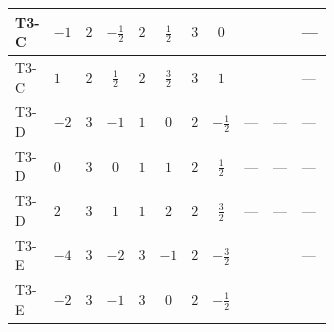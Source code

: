 \documentclass[8pt]{article}
\begin{document}
\begin{landscape}
\begin{longtable}{@{}llcccccc >{\raggedright\arraybackslash}p{0.21\linewidth} >{\raggedright\arraybackslash}p{0.21\linewidth} >{\raggedright\arraybackslash}p{0.21\linewidth}@{}}
\midrule
T3-C & $-1$ & $2$ & $-\frac{1}{2}$ & $2$ & $\frac{1}{2}$ & $3$ & $0$ & \scriptsize\adjustbox{max width=\linewidth}{$\begin{gathered} +8 {\lambda_{HS_2}^{(1)}} {\lambda_{HS_2}^{(A)}}\end{gathered}$} & \scriptsize\adjustbox{max width=\linewidth}{$\begin{gathered} +2 {\lambda_{HS_2}^{(A)}} {\lambda_{S_2}^{(1)}}\end{gathered}$} & --- \\
\midrule
T3-C & $1$ & $2$ & $\frac{1}{2}$ & $2$ & $\frac{3}{2}$ & $3$ & $1$ & \scriptsize\adjustbox{max width=\linewidth}{$\begin{gathered} +8 {\lambda_{HS_2}^{(1)}} {\lambda_{HS_2}^{(A)}}\end{gathered}$} & \scriptsize\adjustbox{max width=\linewidth}{$\begin{gathered} +2 {\lambda_{HS_2}^{(A)}} {\lambda_{S_2}^{(1)}}\end{gathered}$} & --- \\
\midrule
T3-D & $-2$ & $3$ & $-1$ & $1$ & $0$ & $2$ & $-\frac{1}{2}$ & --- & --- & --- \\
\midrule
T3-D & $0$ & $3$ & $0$ & $1$ & $1$ & $2$ & $\frac{1}{2}$ & --- & --- & --- \\
\midrule
T3-D & $2$ & $3$ & $1$ & $1$ & $2$ & $2$ & $\frac{3}{2}$ & --- & --- & --- \\
\midrule
T3-E & $-4$ & $3$ & $-2$ & $3$ & $-1$ & $2$ & $-\frac{3}{2}$ & \scriptsize\adjustbox{max width=\linewidth}{$\begin{gathered} +8 {\lambda_{HS_2}^{(1)}} {\lambda_{HS_2}^{(A)}}\end{gathered}$} & \scriptsize\adjustbox{max width=\linewidth}{$\begin{gathered} +2 {\lambda_{HS_2}^{(A)}} {\lambda_{S_2}^{(1)}}\end{gathered}$} & --- \\
\midrule
T3-E & $-2$ & $3$ & $-1$ & $3$ & $0$ & $2$ & $-\frac{1}{2}$ & \scriptsize\adjustbox{max width=\linewidth}{$\begin{gathered} +8 {\lambda_{HS_2}^{(1)}} {\lambda_{HS_2}^{(A)}}\end{gathered}$} & \scriptsize\adjustbox{max width=\linewidth}{$\begin{gathered} +2 {\lambda_{HS_2}^{(A)}} {\lambda_{S_2}^{(1)}}\end{gathered}$} & \scriptsize\adjustbox{max width=\linewidth}{$\begin{gathered} -\frac{3 {g_1}^2 {\lambda_{HS_2}^{(A)}}}{2}\end{gathered}$} \\

\end{longtable}
\end{landscape}
\end{document}
